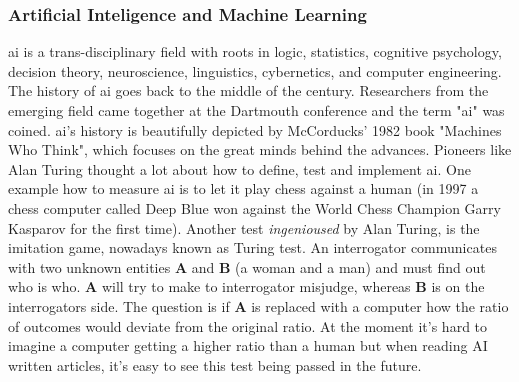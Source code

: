 \subsubsection{Artificial Inteligence and Machine Learning}
\Gls{ai} is a trans-disciplinary field with roots in logic, statistics, cognitive psychology, decision theory, neuroscience, linguistics, cybernetics, and computer engineering\cite{howard2019artificial}.
The history of \gls{ai} goes back to the middle of the  century. 
Researchers from the emerging field came together at the Dartmouth conference and the term "\gls{ai}" was coined\cite{McCarthy1955}. 
\Gls{ai}'s  history is beautifully depicted by McCorducks' 1982 book "Machines Who Think"\cite{McCorduck1982,Apter1982}, which focuses on the great minds behind the advances.
Pioneers like Alan Turing thought a lot about how to define, test and implement \gls{ai}\cite{howard2019artificial}. 
One example how to measure \gls{ai} is to let it play chess against a human\cite{Silver2017} 
(in 1997 a chess computer called Deep Blue won against the World Chess Champion Garry Kasparov for the first time\cite{Feng1999}).
Another test \textit{ingenioused} by Alan Turing, is the imitation game\cite{turing1950imitation}, nowadays known as Turing test.
An interrogator communicates with two unknown entities \textbf{A} and \textbf{B} (a woman and a man) and must find out who is who. 
\textbf{A} will try to make to interrogator misjudge, whereas \textbf{B} is on the interrogators side.
The question is if \textbf{A} is replaced with a computer how the ratio of outcomes would deviate from the original ratio. 
%
%
%
%
At the moment it's hard to imagine a computer getting a higher ratio than a human
but when reading AI written articles\cite{gpt2020}, it's easy to see this test being passed in the future.

